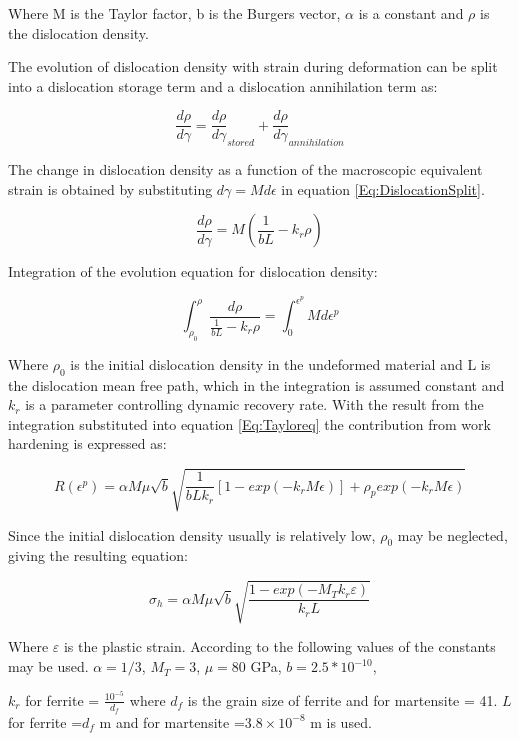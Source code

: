 \documentclass{article}
\begin{document}
\begin{itemize}
Where M is the Taylor factor, b is the Burgers vector, $\alpha$ is a constant and $\rho$ is the dislocation density.    

   
The evolution of dislocation density with strain during deformation can be split into a dislocation storage term and a dislocation annihilation term as:

\begin{equation}
\label{Eq:DislocationSplit}
    \frac{d\rho}{d\gamma}=\frac{d\rho}{d\gamma}_{stored} + \frac{d\rho}{d\gamma}_{annihilation}
\end{equation}

The change in dislocation density as a function of the macroscopic equivalent strain is obtained by substituting $d\gamma=Md\epsilon$ in equation \ref{Eq:DislocationSplit}. 

\begin{equation}
    \frac{d\rho}{d\gamma}=M (\frac{1}{bL}-k_r\rho)
\end{equation}

Integration of the evolution equation for dislocation density:

\begin{equation}
    \int_{\rho_0}^{\rho} \frac{d\rho}{\frac{1}{bL}-k_r\rho} = \int_{0}^{\epsilon^p} Md\epsilon^p
\end{equation}

Where $\rho_0$ is the initial dislocation density in the undeformed material and L is the dislocation mean free path, which in the integration is assumed constant and $k_r$ is a parameter controlling dynamic recovery rate. With the result from the integration substituted into equation \ref{Eq:Tayloreq} the contribution from work hardening is expressed as:

\begin{equation}
    R(\epsilon^p) = \alpha M \mu \sqrt{b} \sqrt{\frac{1}{b L k_r}[1-exp(-k_r M\epsilon)]+\rho_p exp(-k_r M\epsilon)}
\end{equation}

Since the initial dislocation density usually is relatively low, $\rho_0$ may be neglected, giving the resulting equation:

    \begin{equation}
        \sigma_h=\alpha M \mu \sqrt{b} \sqrt{\frac{1-exp(-M_T k_r \varepsilon)}{k_r L}} 
    \end{equation}

Where $\varepsilon$ is the plastic strain. According to \cite{Ramazani} the following values of the constants may be used.
$\alpha=1/3$, 
$M_T=3$, 
$\mu=80$ GPa, 
$b=2.5*10^{-10}$, 

$k_r$  for ferrite = $\frac{10^{-5}}{d_f}$ where $d_f$ is the grain size of ferrite and for martensite = 41. 
$L$ for ferrite =$d_f$ m and for martensite  =$3.8\times10^{-8}$ m is used.  
\end{itemize}    
\end{document}
